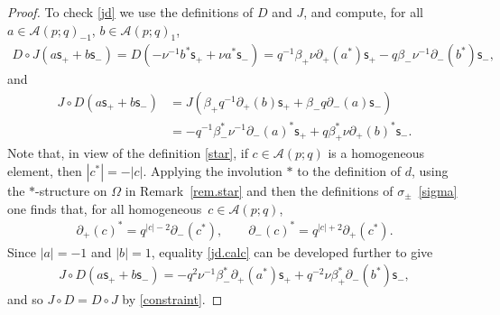 \documentclass[10pt,a4paper]{amsart}
\numberwithin{equation}{section}
\def\AWeyl#1#2{{\mathcal{A}}(#1;#2)}
\begin{document}
\begin{proof}
To check \eqref{jd} we use the def\/initions of $D$ and $J$, and compute, for all $a\in \AWeyl p q_{-1}$, $b\in \AWeyl p q_{1}$,
\begin{gather*}
D\circ J(a {\mathsf{s}}_++b {\mathsf{s}}_-) = D(-\nu^{-1} b^*{\mathsf{s}}_+ + \nu a^*{\mathsf{s}}_-)
 = q^{-1}\beta_+\nu\partial_+ (a^* ) {\mathsf{s}}_+ - q\beta_-\nu^{-1}\partial_- (b^* ) {\mathsf{s}}_-,
\end{gather*}
and
\begin{align}
J\circ D(a {\mathsf{s}}_++b {\mathsf{s}}_-) &= J(\beta_+ q^{-1}\partial_+(b) {\mathsf{s}}_+ + \beta_- q \partial_-(a) {\mathsf{s}}_-)\nonumber \\
& = -q^{-1}\beta^*_-\nu^{-1}\partial_-(a)^*{\mathsf{s}}_+ + q\beta^*_+\nu\partial_+(b)^* {\mathsf{s}}_-.\label{jd.calc}
\end{align}
Note that, in view of the def\/inition \eqref{star}, if $c\in \AWeyl p q$ is a homogeneous element, then $|c^*| = -|c|$. Applying the involution $*$ to the def\/inition of $d$, using the $*$-structure on $\Omega$ in Remark~\ref{rem.star} and then the def\/initions of $\sigma_\pm$~\eqref{sigma} one f\/inds that, for all homogeneous~$c\in \AWeyl p q$,
\begin{gather*}
\partial_+(c)^* = q^{|c|-2}\partial_- (c^* ), \qquad \partial_-(c)^* = q^{|c|+2}\partial_+ (c^* ).
\end{gather*}
Since $|a|=-1$ and $|b|=1$, equality \eqref{jd.calc} can be developed further to give
\begin{gather*}
J\circ D(a {\mathsf{s}}_++b {\mathsf{s}}_-) = -q^2\nu^{-1}\beta_-^*\partial_+(a^*) {\mathsf{s}}_+ + q^{-2}\nu\beta_+^*\partial_-(b^*) {\mathsf{s}}_-,
\end{gather*}
and so $J\circ D = D\circ J$ by \eqref{constraint}.


\end{proof}
\end{document}
